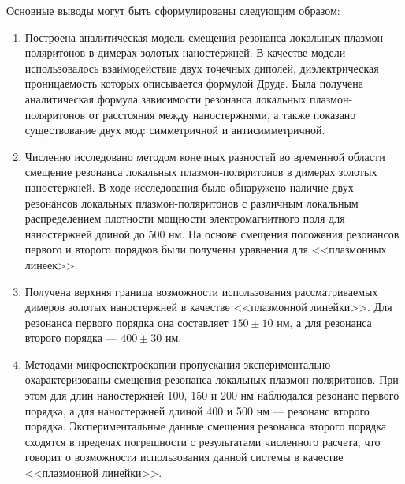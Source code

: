 
Основные выводы могут быть сформулированы следующим образом:
\begin{enumerate}
\item Построена аналитическая модель смещения резонанса локальных плазмон-поляритонов в димерах золотых наностержней.  В качестве модели использовалось взаимодействие двух точечных диполей, диэлектрическая проницаемость которых описывается формулой Друде. Была получена аналитическая формула зависимости резонанса локальных плазмон-поляритонов от расстояния между наностержнями, а также показано существование двух мод: симметричной и антисимметричной.
\item Численно исследовано методом конечных разностей во временной области  смещение резонанса локальных плазмон-поляритонов в димерах золотых наностержней. В ходе исследования было обнаружено наличие двух резонансов локальных плазмон-поляритонов с различным локальным распределением плотности мощности электромагнитного поля для наностержней длиной до 500 нм. На основе смещения положения резонансов первого и второго порядков были получены уравнения для <<плазмонных линеек>>.
\item Получена верхняя граница возможности использования рассматриваемых димеров золотых наностержней в качестве <<плазмонной линейки>>. Для резонанса первого порядка она составляет $  150 \pm 10 $ нм, а для резонанса второго порядка --- $ 400 \pm 30 $ нм.
\item Методами микроспектроскопии пропускания экспериментально охарактеризованы смещения резонанса локальных плазмон-поляритонов.  При этом для длин наностержней 100, 150 и 200 нм наблюдался резонанс первого порядка, а для наностержней длиной 400 и 500 нм --- резонанс второго порядка. Экспериментальные данные смещения резонанса второго порядка сходятся в пределах погрешности с результатами численного расчета, что говорит о возможности использования данной системы в качестве <<плазмонной линейки>>.

\end{enumerate}
